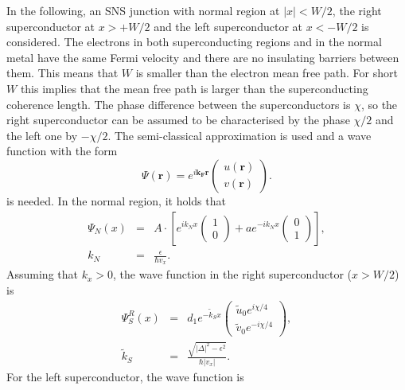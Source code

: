 In the following, an SNS junction with normal region at $|x| < W/2$, the right superconductor at $x > + W/2$ and the left superconductor at $x < -W/2$ is considered. The electrons in both superconducting regions and in the normal metal have the same Fermi velocity and there are no insulating barriers between them. This means that $W$  is smaller than the electron mean free path. For short $W$ this implies that the mean free path is larger than the superconducting coherence length. The phase difference between the superconductors is $\chi$, so the right superconductor can be assumed to be characterised by the phase $\chi/2$ and the left one by $-\chi/2$. 
The semi-classical approximation is used and a wave function with the form
\begin{equation}
\Psi \left( \mathbf{r} \right) = e^{i \mathbf{k_F} \mathbf{r} } \begin{pmatrix} u \left( \mathbf{r} \right) \\ v \left( \mathbf{r} \right)\end{pmatrix}.
\end{equation}
is needed. 
In the normal region, it holds that 
\begin{eqnarray}
\Psi_N \left( x \right) &=& A\cdot \left[ e^{i k_N x } \begin{pmatrix} 1 \\ 0 \end{pmatrix} + a e^{-i k_N x } \begin{pmatrix} 0 \\ 1 \end{pmatrix} \right], \label{eq:sns-psi-normal}\\
k_N &=& \frac{\epsilon}{\hbar v_x}.
\end{eqnarray}
Assuming that $k_x > 0$, the wave function in the right superconductor ($x > W/2$) is
\begin{eqnarray}
\Psi_S^R \left( x \right) &=& d_1 e^{ - \tilde{k}_S x } \begin{pmatrix} \tilde{u}_0 e^{i \chi/4} \\ \tilde{v}_0 e^{-i \chi/4} \end{pmatrix},\\
\tilde{k}_S  &=& \frac{\sqrt{|\Delta|^2 - \epsilon^2 }}{\hbar |v_x|}.
\end{eqnarray}
For the left superconductor, the wave function is
